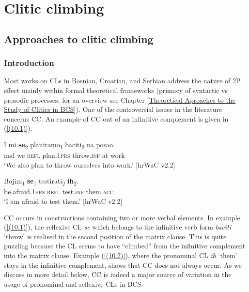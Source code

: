 \part{Clitic climbing}
\label{part3}
\chapter{Approaches to clitic climbing}
\label{Approaches to clitic climbing}
\section{Introduction}
\label{Introduction:11}

Most works on CLs in Bosnian, Croatian, and Serbian address the nature of 2P effect mainly within formal theoretical frameworks (primacy of syntactic vs prosodic processes; for an overview see Chapter \ref{Theoretical Aproaches to the Study of Clitics in BCS}). One of the controversial issues in the literature concerns CC. An example of CC out of an infinitive complement is given in (\ref{(10.1)}).

\begin{exe}\ex\label{(10.1)}
\gll I mi  \textbf{se}\textsubscript{2} planiramo\textsubscript{1} baciti\textsubscript{2} na posao.\\
and we \textsc{refl} plan.1\textsc{prs}	throw.\textsc{inf} at work \\
\glt ‘We also plan to throw ourselves into work.’ 
\hfill [hrWaC v2.2]

\ex\label{(10.2)}
\gll Bojim\textsubscript{1} \textbf{se}\textsubscript{1} testirati\textsubscript{2} \textbf{ih}\textsubscript{2}.\\
be.afraid.1\textsc{prs} \textsc{refl} test.\textsc{inf} them.\textsc{acc}\\
\glt ‘I am afraid to test them.’
\hfill  [hrWaC v2.2]
\end{exe}

\noindent CC occurs in constructions containing two or more verbal elements. In example (\ref{(10.1)}), the reflexive CL \textit{se} which belongs to the infinitive verb form \textit{baciti} ‘throw’ is realised in the second position of the matrix clause. This is quite puzzling because the CL seems to have “climbed” from the infinitive complement into the matrix clause. Example (\ref{(10.2)}), where the pronominal CL \textit{ih} ‘them’ stays in the infinitive complement, shows that CC does not always occur. As we discuss in more detail below, CC is indeed a major source of variation in the usage of pronominal and reflexive CLs in BCS. 

